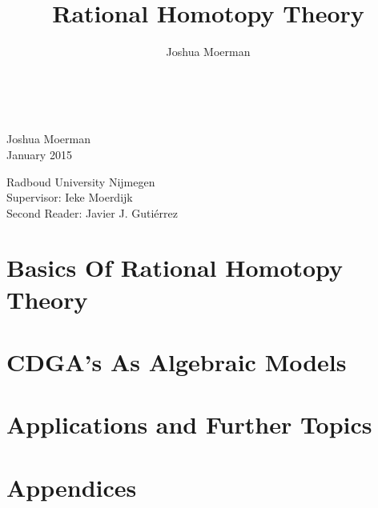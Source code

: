 \documentclass[a4paper,12pt,footinclude=true,headinclude=true,oneside,dottedtoc]{scrbook}
\title{Rational Homotopy Theory}
\author{Joshua Moerman}
\newcommand{\blankpage}{\newpage\thispagestyle{empty}\mbox{}}
\begin{document}
\begin{titlepage}
\large

\vspace*{4cm}

\begin{center}
	\begingroup
    \color{Maroon} \\ \bigskip
    \endgroup
	
	Joshua Moerman\\
	January 2015

	\vspace{7cm}

	Radboud University Nijmegen\\
	Supervisor: Ieke Moerdijk\\
	Second Reader: Javier J. Gutiérrez
\end{center}

\end{titlepage}
\blankpage




\blankpage
\tableofcontents
{}
\blankpage


\part{Basics Of Rational Homotopy Theory}





\part{CDGA's As Algebraic Models}






\part{Applications and Further Topics}




\appendix
\part{Appendices}






\end{document}

